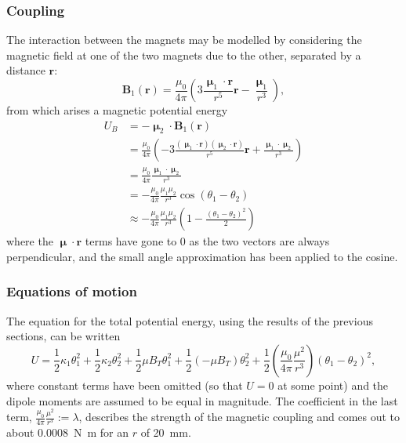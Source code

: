 \documentclass{article}
\begin{document}
\subsubsection{Coupling}
The interaction between the magnets may be modelled by considering the magnetic field at one of the two magnets due to the other, separated by a distance $\mathbf{r}$:
\begin{equation*}
    \mathbf{B}_1(\mathbf{r}) = \frac{\mu_0}{4\pi}\left( 3\frac{\bm{\upmu}_1\cdot\mathbf{r}}{r^5}\mathbf{r} - \frac{\bm{\upmu}_1}{r^3} \right),
\end{equation*}
from which arises a magnetic potential energy
\begin{equation*}
    \begin{aligned}
        U_B &= -\bm{\upmu}_2\cdot \mathbf{B}_1(\mathbf{r}) \\
            &= \frac{\mu_0}{4\pi}\left( -3\frac{(\bm{\upmu}_1\cdot\mathbf{r})(\bm{\upmu}_2\cdot\mathbf{r})}{r^5}\mathbf{r} + \frac{\bm{\upmu}_1\cdot\bm{\upmu}_2}{r^3} \right) \\
            &= \frac{\mu_0}{4\pi}\frac{\bm{\upmu}_1\cdot\bm{\upmu}_2}{r^3} \\
            &= -\frac{\mu_0}{4\pi}\frac{\mu_1\mu_2}{r^3}\cos(\theta_1 - \theta_2) \\
            &\approx -\frac{\mu_0}{4\pi}\frac{\mu_1\mu_2}{r^3} \left( 1 - \frac{(\theta_1 - \theta_2)^2}{2} \right)
    \end{aligned}
\end{equation*}
where the $\bm{\upmu}\cdot \mathbf{r}$ terms have gone to 0 as the two vectors are always perpendicular, and the small angle approximation has been applied to the cosine.

\subsubsection{Equations of motion}
The equation for the total potential energy, using the results of the previous sections, can be written
\begin{equation*}
    U = \frac{1}{2}\kappa_1\theta_1^2 + \frac{1}{2}\kappa_2\theta_2^2+ \frac{1}{2}\mu B_T\theta_1^2 + \frac{1}{2}\left( -\mu B_T \right)\theta_2^2 + \frac{1}{2}\left( \frac{\mu_0}{4\pi}\frac{\mu^2}{r^3} \right)\left( \theta_1 - \theta_2 \right)^2,
\end{equation*}
where constant terms have been omitted (so that $U=0$ at some point) and the dipole moments are assumed to be equal in magnitude.
The coefficient in the last term, $\frac{\mu_0}{4\pi}\frac{\mu^2}{r^3} := \lambda$, describes the strength of the magnetic coupling and comes out to about \qty{0.0008}{N.m} for an $r$ of \qty{20}{mm}.
\end{document}
